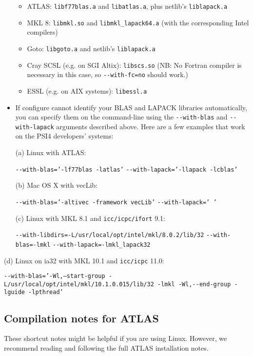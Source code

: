 \documentclass[12pt]{article}
\begin{document}
\begin{itemize}
\begin{itemize}  
    \item ATLAS: {\tt libf77blas.a} and {\tt libatlas.a}, plus netlib's
    {\tt liblapack.a}
    \item MKL 8: {\tt libmkl.so} and {\tt libmkl\_lapack64.a} (with the corresponding Intel compilers)
    \item Goto: {\tt libgoto.a} and netlib's {\tt liblapack.a}
    \item Cray SCSL (e.g. on SGI Altix): {\tt libscs.so} (NB: No Fortran compiler
      is necessary in this case, so {\tt -}{\tt -with-fc=no} should work.)
    \item ESSL (e.g. on AIX systems): {\tt libessl.a}
    \end{itemize}  
  \item If configure cannot identify your BLAS and LAPACK libraries
    automatically, you can specify them on the command-line using the
    {\tt -}{\tt -with-blas} and {\tt -}{\tt -with-lapack} arguments
    described above.  Here are a few examples that work on the PSI4
    developers' systems:
  
    (a) Linux with ATLAS:
  
    {\tt -}{\tt -with-blas='-lf77blas -latlas'} {\tt -}{\tt -with-lapack='-llapack -lcblas'}

    (b) Mac OS X with vecLib: 
  
    {\tt -}{\tt -with-blas='-altivec -framework vecLib'} {\tt -}{\tt -with-lapack=' '}
  
    (c) Linux with MKL 8.1 and {\tt icc/icpc/ifort} 9.1: 
  
    {\tt -}{\tt -with-libdirs=-L/usr/local/opt/intel/mkl/8.0.2/lib/32} {\tt -}{\tt -with-blas=-lmkl} {\tt -}{\tt -with-lapack=-lmkl\_lapack32}

\end{itemize}

    (d) Linux on ia32 with MKL 10.1 and {\tt icc/icpc} 11.0:

    {\tt -}{\tt -with-blas='-Wl,--start-group -L/usr/local/opt/intel/mkl/10.1.0.015/lib/32 -lmkl -Wl,}{\tt -}{\tt -end-group -lguide -lpthread'}

\subsection{Compilation notes for ATLAS}
   These shortcut notes might be helpful if you are using Linux.  However,
   we recommend reading and following the full ATLAS installation notes.
\end{document}
